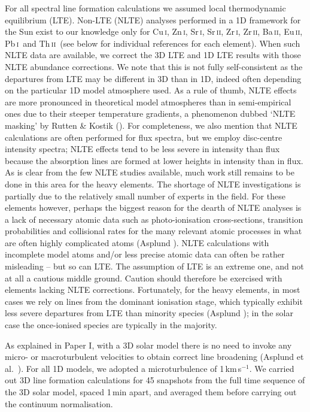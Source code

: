 \documentclass[traditabstract]{aa}
\newcommand{\altcui}{Cu\,\textsc{i}}
\newcommand{\altzni}{Zn\,\textsc{i}}
\newcommand{\altsri}{Sr\,\textsc{i}}
\newcommand{\altsrii}{Sr\,\textsc{ii}}
\newcommand{\altzri}{Zr\,\textsc{i}}
\newcommand{\altzrii}{Zr\,\textsc{ii}}
\newcommand{\altbaii}{Ba\,\textsc{ii}}
\newcommand{\altpbi}{Pb\,\textsc{i}}
\newcommand{\altthii}{Th\,\textsc{ii}}
\newcommand{\alteuii}{Eu\,\textsc{ii}}
\newcommand{\pbi}{\altpbi\ }
\newcommand{\thii}{\altthii\ }
\begin{document}
For all spectral line formation calculations we assumed local thermodynamic equilibrium (LTE). Non-LTE (NLTE) analyses performed in a 1D framework for the Sun exist to our knowledge only for \altcui, \altzni, \altsri, \altsrii, \altzri, \altzrii,  \altbaii, \alteuii, \pbi and \thii (see below for individual references for each element). When such NLTE data are available, we correct the 3D LTE and 1D LTE results with those NLTE abundance corrections. We note that this is not fully self-consistent as the departures from LTE may be different in 3D than in 1D, indeed often depending on the particular 1D model atmosphere used.  As a rule of thumb, NLTE effects are more pronounced in theoretical model atmospheres than in semi-empirical ones due to their steeper temperature gradients, a phenomenon dubbed `NLTE masking' by Rutten \& Kostik (\cite{1982A&A...115..104R}). For completeness, we also mention that NLTE calculations are often performed for flux spectra, but we employ disc-centre intensity spectra; NLTE effects tend to be less severe in intensity than flux because the absorption lines are formed at lower heights in intensity than in flux. As is clear from the few NLTE studies available, much work still remains to be done in this area for the heavy elements. The shortage of NLTE investigations is partially due to the relatively small number of experts in the field.  For these elements however, perhaps the biggest reason for the dearth of NLTE analyses is a lack of necessary atomic data such as photo-ionisation cross-sections, transition probabilities and collisional rates for the many relevant atomic processes in what are often highly complicated atoms (Asplund \cite{asp7}).  NLTE calculations with incomplete model atoms and/or less precise atomic data can often be rather misleading -- but so can LTE.  The assumption of LTE is an extreme one, and not at all a cautious middle ground.  Caution should therefore be exercised with elements lacking NLTE corrections.  Fortunately, for the heavy elements, in most cases we rely on lines from the dominant ionisation stage, which typically exhibit less severe departures from LTE than minority species (Asplund \cite{asp7}); in the solar case the once-ionised species are typically in the majority. 

As explained in Paper I, with a 3D solar model there is no need to invoke any micro- or macroturbulent velocities to obtain correct line broadening (Asplund et al.\ \cite{asp1}).
For all 1D models, we adopted a microturbulence of 1\,km\,s$^{-1}$.  We carried out 3D line formation calculations for 45 snapshots from the full time sequence of the 3D solar model, spaced 1\,min apart,  and averaged them before carrying out the continuum normalisation.
\end{document}
